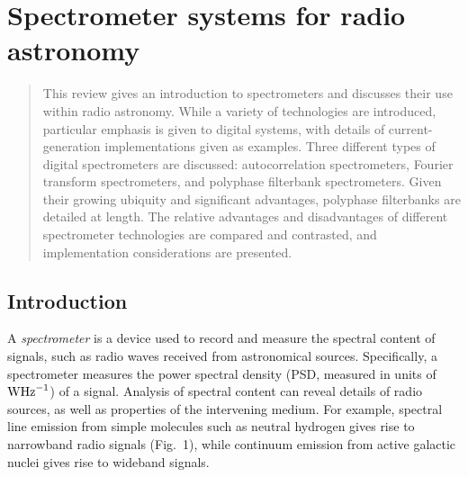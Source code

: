 \documentclass{ws-rv961x669}
\begin{document}
\chapter[Spectrometers]{Spectrometer systems for radio astronomy}\label{spec_chap}

\author[D. Price]{Danny C. Price}

\address{Campbell Hall 339, UC Berkeley\\
Address goes here, \\
dancpr@berkeley.edu}

\begin{abstract}
This review gives an introduction to spectrometers and discusses their use within radio astronomy. While a variety of technologies are introduced, particular emphasis is given to digital systems, with details of current-generation implementations given as examples. Three different types of digital spectrometers are discussed: autocorrelation spectrometers, Fourier transform spectrometers, and polyphase filterbank spectrometers.  Given their growing ubiquity and significant advantages, polyphase filterbanks are detailed at length. The relative advantages and disadvantages of different spectrometer technologies are compared and contrasted, and implementation considerations are presented.

\end{abstract}


\body

\section{Introduction}\label{sec:intro}

A \emph{spectrometer} is a device used to record and measure the spectral content of signals, such as radio waves received from astronomical sources. Specifically, a spectrometer measures the power spectral density (PSD, measured in units of $\rm{WHz}^{-1}$) of a signal. Analysis of spectral content can reveal details of radio sources, as well as properties of the intervening medium. For example, spectral line emission from simple molecules such as neutral hydrogen gives rise to narrowband radio signals (Fig.~1), while continuum emission from active galactic nuclei gives rise to wideband signals.
\end{document}
